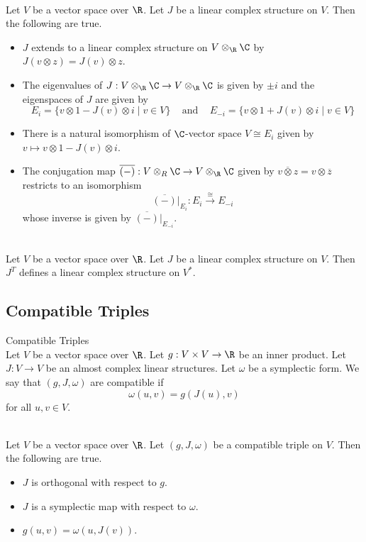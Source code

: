 \documentclass[a4paper]{article}
\begin{document}
\begin{prp}{}{}\\
Let $V$ be a vector space over $\R$. Let $J$ be a linear complex structure on $V$. Then the following are true. 
\begin{itemize}
\item $J$ extends to a linear complex structure on $V\otimes_\R\C$ by $J(v\otimes z)=J(v)\otimes z$. 
\item The eigenvalues of $J:V\otimes_\R\C\to V\otimes_\R\C$ is given by $\pm i$ and the eigenspaces of $J$ are given by $$E_i=\{v\otimes 1-J(v)\otimes i\;|\;v\in V\}\;\;\;\text{ and }\;\;\;E_{-i}=\{v\otimes 1+J(v)\otimes i\;|\;v\in V\}$$
\item There is a natural isomorphism of $\C$-vector space $V\cong E_i$ given by $v\mapsto v\otimes 1-J(v)\otimes i$. 
\item The conjugation map $\overline{(-)}:V\otimes_R\C\to V\otimes_\R\C$ given by $\overline{v\otimes z}=v\otimes\overline{z}$ restricts to an isomorphism $$\overline{(-)}|_{E_i}:E_i\overset{\cong}{\to}E_{-i}$$ whose inverse is given by $\overline{(-)}|_{E_{-i}}$. 
\end{itemize}
\end{prp}

\begin{prp}{}{}\\
Let $V$ be a vector space over $\R$. Let $J$ be a linear complex structure on $V$. Then $J^T$ defines a linear complex structure on $V^\ast$. 
\end{prp}

\subsection{Compatible Triples}
\begin{defn}{Compatible Triples}{}\\
Let $V$ be a vector space over $\R$. Let $g:V\times V\to\R$ be an inner product. Let $J:V\to V$ be an almost complex linear structures. Let $\omega$ be a symplectic form. We say that $(g,J,\omega)$ are compatible if $$\omega(u,v)=g(J(u),v)$$ for all $u,v\in V$. 
\end{defn}

\begin{prp}{}{}\\
Let $V$ be a vector space over $\R$. Let $(g,J,\omega)$ be a compatible triple on $V$. Then the following are true. 
\begin{itemize}
\item $J$ is orthogonal with respect to $g$. 
\item $J$ is a symplectic map with respect to $\omega$. 
\item $g(u,v)=\omega(u,J(v))$. 
\end{itemize}
\end{prp}
\end{document}

